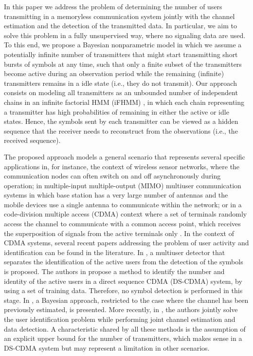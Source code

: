 \documentclass[a4paper]{article}
\begin{document}
In this paper we address the problem of determining the number of users transmitting in a memoryless communication
system jointly with the channel estimation and the detection of the transmitted data. In particular, we aim to solve this problem in a fully unsupervised way, where no signaling data are used. To this end, we propose a Bayesian nonparametric model in which we assume a potentially infinite number of transmitters that might start transmitting short bursts of symbols at any time, such that only a finite subset of the transmitters become active during an observation period while the remaining (infinite) transmitters remains in a idle state (i.e., they do not transmit). 
%
Our approach consists on modeling all transmitters as an unbounded number of independent chains in an infinite factorial HMM (iFHMM) \cite{IFHMM}, in which each chain representing a transmitter has high probabilities of remaining in either the active or idle states. Hence, the symbols sent by each transmitter can be viewed as a hidden sequence that the receiver needs to reconstruct from the observations (i.e., the received sequence). 


The proposed approach  models a general scenario that represents several specific applications in, for instance, the context of wireless sensor networks, where the communication nodes can often switch on and off asynchronously during operation; in multiple-input multiple-output (MIMO) multiuser communication systems \cite{Hoydis13} in which base station has a very large number of antennas and the mobile devices use a single antenna to communicate within the network; or in a code-division multiple access (CDMA) context where a set of terminals randomly access the channel to communicate with a common access point, which receives the superposition of signals from the active terminals only \cite{Vazquez2013}. In the context of CDMA systems, several recent papers addressing the problem of user activity and identification can be found in the literature. In \cite{AD4}, a multiuser detector that separates the identification of the active users from the detection of the symbols is proposed. The authors in \cite{AD10} propose a method to identify the number and identity of the active users in a direct sequence CDMA (DS-CDMA) system, by using a set of training data. Therefore, no symbol detection is performed in this stage.  In \cite{AD11}, a Bayesian approach, restricted to the case where the channel has been previously estimated, is presented. More recently, in \cite{Vazquez2013}, the authors jointly solve the user identification problem while performing joint channel estimation and
data detection. 
%
A characteristic shared by all these methods is the assumption of an explicit upper bound for the number of transmitters, which makes sense in a DS-CDMA system but may represent a limitation in other scenarios.
\end{document}
